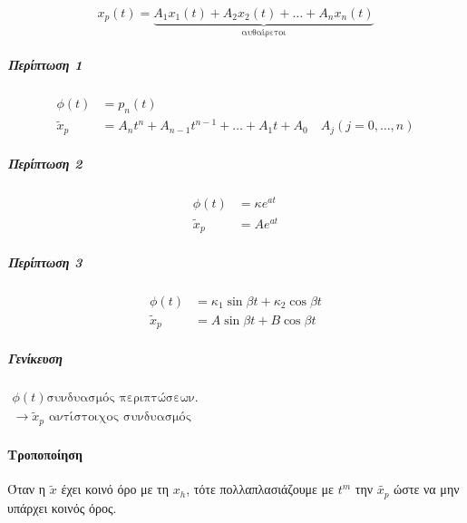 \documentclass[11pt,a4paper,titlepage,final]{article}
\begin{document}
\[
x_p(t) = \underbrace{A_1x_1(t)+A_2x_2(t) + \dots + A_nx_n(t)}_{\text{αυθαίρετοι}}
\]

\subparagraph{Περίπτωση 1}
\begin{align*}
\phi(t)&=p_n(t)\\
\tilde x_p &= A_nt^n+A_{n-1}t^{n-1}+\dots+A_1t+A_0\quad A_j (j=0,\dots,n)
\end{align*}

\subparagraph{Περίπτωση 2}
\begin{align*}
\phi(t)&=\kappa e^{at}\\
\tilde x_p &= Ae^{at}
\end{align*}

\subparagraph{Περίπτωση 3}
\begin{align*}
\phi(t) &= \kappa_1\sin\beta t + \kappa_2\cos\beta t\\
\tilde x_p &= A\sin\beta t + B\cos\beta t
\end{align*}

\subparagraph{Γενίκευση}
\(
\begin{matrix}
	\phi(t) \text {συνδυασμός περιπτώσεων.}               \\
	\rightarrow \tilde x_p \text{ αντίστοιχος συνδυασμός}
\end{matrix}
\)

\paragraph{Τροποποίηση}
Όταν η \(\widetilde{x}\) έχει κοινό όρο με τη \(x_h\), τότε πολλαπλασιάζουμε με \(t^m\) την \(\widetilde{x_p}\) ώστε να μην υπάρχει κοινός όρος.
\end{document}

